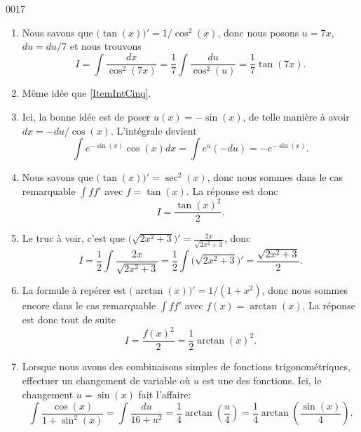 \begin{corrige}{0017}
\begin{enumerate}
\item
Nous savons que $\big( \tan(x) \big)'=1/\cos^2(x)$, donc nous posons $u=7x$, $du=du/7$ et nous trouvons
\begin{equation}
	I=\int\frac{ dx }{ \cos^2(7x) }=\frac{1}{ 7 }\int\frac{ du }{ \cos^2(u) }=\frac{1}{ 7 }\tan(7x).
\end{equation}

\item Même idée que \ref{ItemIntCinq}.

\item
Ici, la bonne idée est de poser $u(x)=-\sin(x)$, de telle manière à avoir $dx=-du/\cos(x)$. L'intégrale devient
\begin{equation}
	\int e^{-\sin(x)}\cos(x)dx=\int e^u(-du)=- e^{-\sin(x)}.
\end{equation}

\item
Nous savons que $\big( \tan(x) \big)'=\sec^2(x)$, donc nous sommes dans le cas remarquable $\int ff'$ avec $f=\tan(x)$. La réponse est donc
\begin{equation}
	I=\frac{ \tan(x)^2 }{2}.
\end{equation}

\item
Le truc à voir, c'est que $\big( \sqrt{2x^2+3} \big)'=\frac{ 2x }{ \sqrt{2x^2+3} }$, donc
\begin{equation}
	I=\frac{ 1 }{2}\int \frac{ 2x }{ \sqrt{2x^2+3} }=\frac{ 1 }{2}\int \big( \sqrt{2x^2+3} \big)'=\frac{ \sqrt{2x^2+3} }{2}.
\end{equation}

\item
La formule à repérer est $\big(\arctan(x)\big)'=1/(1+x^2)$, donc nous sommes encore dans le cas remarquable $\int ff'$ avec $f(x)=\arctan(x)$. La réponse est donc tout de suite
\begin{equation}
	I=\frac{ f(x)^2 }{ 2 }=\frac{ 1 }{2}\arctan(x)^2.
\end{equation}

\item
Lorsque nous avons des combinaisons simples de fonctions trigonométriques, effectuer un changement de variable où $u$ est une des fonctions. Ici, le changement $u=\sin(x)$ fait l'affaire:
\begin{equation}
	\int\frac{ \cos(x) }{ 1+\sin^2(x) }=\int\frac{ du }{ 16+u^2 }=\frac{1}{ 4 }\arctan\left( \frac{ u }{ 4 } \right)=\frac{1}{ 4 }\arctan\left( \frac{ \sin(x) }{ 4 } \right).
\end{equation}


\end{enumerate}
\end{corrige}
